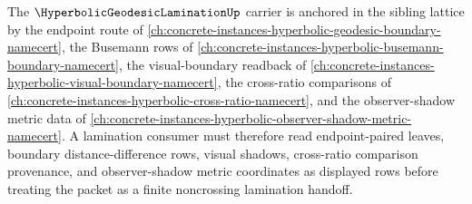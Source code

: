 The $\HyperbolicGeodesicLaminationUp$ carrier is anchored in the sibling lattice by the endpoint route of \autoref{ch:concrete-instances-hyperbolic-geodesic-boundary-namecert}, the Busemann rows of \autoref{ch:concrete-instances-hyperbolic-busemann-boundary-namecert}, the visual-boundary readback of \autoref{ch:concrete-instances-hyperbolic-visual-boundary-namecert}, the cross-ratio comparisons of \autoref{ch:concrete-instances-hyperbolic-cross-ratio-namecert}, and the observer-shadow metric data of \autoref{ch:concrete-instances-hyperbolic-observer-shadow-metric-namecert}. A lamination consumer must therefore read endpoint-paired leaves, boundary distance-difference rows, visual shadows, cross-ratio comparison provenance, and observer-shadow metric coordinates as displayed rows before treating the packet as a finite noncrossing lamination handoff.
